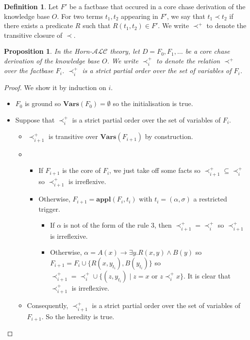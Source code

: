\documentclass{article}
\newtheorem{proposition}{Proposition}[section]
\theoremstyle{definition}
\newtheorem{definition}{Definition}[section]
\theoremstyle{remark}
\newcommand{\Vars}{\textbf{Vars}}
\newcommand{\Appl}{\textbf{appl}}
\begin{document}
\begin{definition}
Let $F'$ be a factbase that occured in a core chase derivation of the knowledge base $O$. For two terms $t_1,t_2$ appearing in $F'$, we say that $t_1 \prec t_2$ if there exists a predicate $R$ such that $R(t_1,t_2) \in F'$. We write $\prec^+$ to denote the transitive closure of $\prec$.
\end{definition}

\begin{proposition}
In the Horn-$\mathcal{ALC}$ theory, let $D = F_0,F_1,\ldots$ be a core chase derivation of the knowledge base $O$. We write $\prec^+_i$ to denote the relation $\prec^+$ over the factbase $F_i$. $\prec^+_i$ is a strict partial order over the set of variables of $F_i$.
\end{proposition}

\begin{proof}
We show it by induction on $i$.
\begin{itemize}
\item $F_0$ is ground so $\Vars(F_0) = \emptyset$ so the initialisation is true.
\item Suppose that $\prec^+_i$ is a strict partial order over the set of variables of $F_i$.
\begin{itemize}
\item $\prec^+_{i+1}$ is transitive over $\Vars(F_{i+1})$ by construction.
\item 
\begin{itemize}
\item If $F_{i+1}$ is the core of $F_i$, we just take off some facts so $\prec^+_{i+1} \subseteq \prec^+_{i}$  so $\prec^+_{i+1}$ is irreflexive.
\item Otherwise, $F_{i+1}= \Appl(F_{i},t_i)$ with $t_i = (\alpha,\sigma)$ a restricted trigger. 
\begin{itemize}
\item If $\alpha$ is not of the form of the rule $3$, then $\prec^+_{i+1} = \prec^+_{i}$  so $\prec^+_{i+1}$ is irreflexive.
\item Otherwise, $\alpha = A(x) \rightarrow \exists y.R(x,y) \wedge B(y)$ so $F_{i+1} = F_i \cup \{R(x,y_{t_i}),B(y_{t_i})\}$ so $\prec^+_{i+1} = \prec^+_{i} \cup \{(z,y_{t_i}) \mid z = x$ or $z \prec_i^+ x\}$. It is clear that $\prec^+_{i+1}$ is irreflexive.
\end{itemize}
\end{itemize}

\item Consequently, $\prec^+_{i+1}$ is a strict partial order over the set of variables of $F_{i+1}$. So the heredity is true.
\end{itemize}
\end{itemize}
\end{proof}
\end{document}
